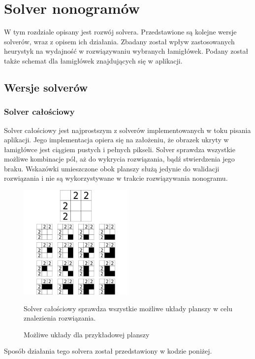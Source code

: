 \chapter{Solver nonogramów}
\thispagestyle{chapterBeginStyle}

    W tym rozdziale opisany jest rozwój solvera. Przedstawione są kolejne wersje solverów, wraz z
opisem ich działania. Zbadany został wpływ zastosowanych heurystyk na wydajność w rozwiązywaniu 
wybranych łamigłówek. Podany został także schemat dla łamigłówek znajdujących się w aplikacji.



\section{Wersje solverów}


\subsection{Solver całościowy}
    Solver całościowy jest najprostszym z solverów implementowanych w toku pisania aplikacji. Jego
implementacja opiera się na założeniu, że obrazek ukryty w łamigłówce jest ciągiem pustych i pełnych
pikseli. Solver sprawdza wszystkie możliwe kombinacje pól, aż do wykrycia rozwiązania, bądź stwierdzenia
jego braku. Wskazówki umieszczone obok planszy służą jedynie do walidacji rozwiązania i nie są
wykorzystywane w trakcie rozwiązywania nonogramu.

\begin{figure}[!htb]
    \centering
    \includegraphics[width=0.5\textwidth]{images/all_solver_example.png}
    \caption{Możliwe układy dla przykładowej planszy}
    Solver całościowy sprawdza wszystkie możliwe układy planszy w celu znalezienia rozwiązania.
\end{figure}

    Sposób działania tego solvera został przedstawiony w kodzie poniżej.

